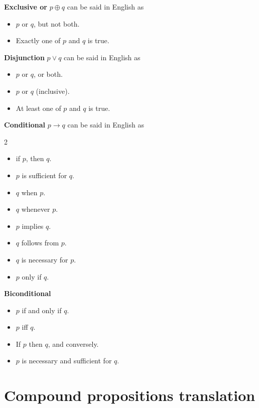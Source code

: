 \documentclass[12pt, oneside]{article}
\begin{document}
{\bf Exclusive or} $p \oplus q$ can be said in English as

\vspace{-20pt}
\begin{itemize}
    \item $p$ or $q$, but not both.
    \item Exactly one of $p$ and $q$ is true.
\end{itemize}

{\bf Disjunction} $p \lor q$ can be said in English as

\vspace{-20pt}
\begin{itemize}
    \item $p$ or $q$, or both.
    \item $p$ or $q$ (inclusive).
    \item At least one of $p$ and $q$ is true.
\end{itemize}

{\bf Conditional} $p \to q$ can be said in English as

\begin{multicols}{2}
\begin{itemize}
    \item if $p$, then $q$.
    \item $p$ is sufficient for $q$.
    \item $q$ when $p$.
    \item $q$ whenever $p$.
    \item $p$ implies $q$.
    \item $q$ follows from $p$.
    \item $q$ is necessary for $p$.
    \item $p$ only if $q$.
\end{itemize}
\end{multicols}

{\bf Biconditional}

\vspace{-20pt}
\begin{itemize}
    \item $p$ if and only if $q$.
    \item $p$ iff $q$.
    \item If $p$ then $q$, and conversely.
    \item $p$ is necessary and sufficient for $q$.
\end{itemize} \vfill
\section*{Compound propositions translation}
\end{document}
